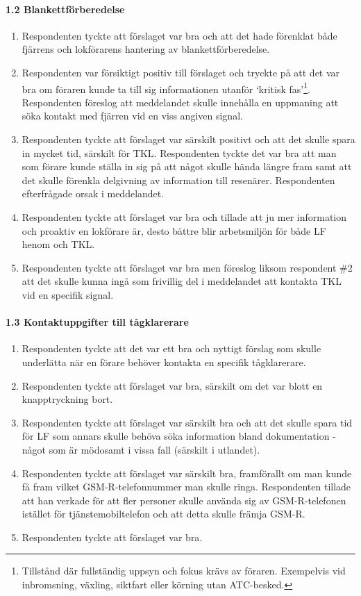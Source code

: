 \paragraph{1.2 Blankettförberedelse}
\begin{enumerate}
    \item Respondenten tyckte att förslaget var bra och att det hade förenklat både fjärrens och lokförarens hantering av blankettförberedelse.
    \item Respondenten var försiktigt positiv till förslaget och tryckte på att det var bra om föraren kunde ta till sig informationen utanför \lq{}kritisk fas\rq{}\footnote{Tillstånd där fullständig uppsyn och fokus krävs av föraren. Exempelvis vid inbromsning, växling, siktfart eller körning utan ATC-besked.}.
    Respondenten föreslog att meddelandet skulle innehålla en uppmaning att söka kontakt med fjärren vid en viss angiven signal.
    \item Respondenten tyckte att förslaget var särskilt positivt och att det skulle spara in mycket tid, särskilt för TKL.
    Respondenten tyckte det var bra att man som förare kunde ställa in sig på att något skulle hända längre fram samt att det skulle förenkla delgivning av information till resenärer.
    Respondenten efterfrågade orsak i meddelandet.
    \item Respondenten tyckte att förslaget var bra och tillade att ju mer information och proaktiv en lokförare är, desto bättre blir arbetsmiljön för både LF henom och TKL\@.
    \item Respondenten tyckte att förslaget var bra men föreslog liksom respondent \#2 att det skulle kunna ingå som frivillig del i meddelandet att kontakta TKL vid en specifik signal.
\end{enumerate}
\hspace{-12pt}
\paragraph{1.3 Kontaktuppgifter till tågklarerare}
\begin{enumerate}
    \item Respondenten tyckte att det var ett bra och nyttigt förslag som skulle underlätta när en förare behöver kontakta en specifik tågklarerare.
    \item Respondenten tyckte att förslaget var bra, särskilt om det var blott en knapptryckning bort.
    \item Respondenten tyckte att förslaget var särskilt bra och att det skulle spara tid för LF som annars skulle behöva söka information bland dokumentation - något som är mödosamt i vissa fall (särskilt i utlandet).
    \item Respondenten tyckte att förslaget var särskilt bra, framförallt om man kunde få fram vilket GSM-R-telefonnummer man skulle ringa.
    Respondenten tillade att han verkade för att fler personer skulle använda sig av GSM-R-telefonen istället för tjänstemobiltelefon och att detta skulle främja GSM-R\@.
    \item Respondenten tyckte att förslaget var bra.
\end{enumerate}
\hspace{-12pt}

